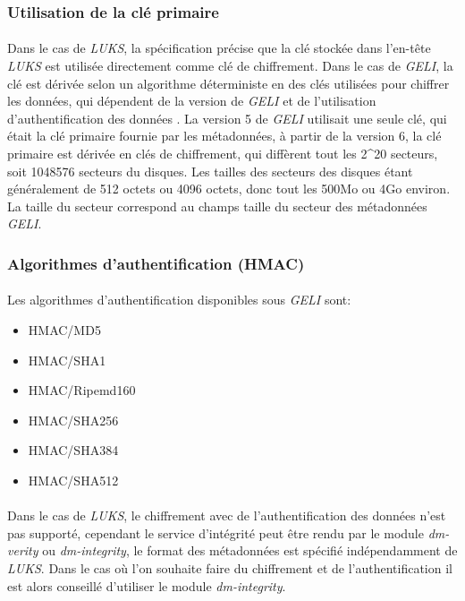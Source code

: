 \subsubsection{Utilisation de la clé primaire}
\paragraph{}
Dans le cas de {\em LUKS}, la spécification \cite{onDiskFormatLuks} précise 
que la clé stockée dans l'en-tête {\em LUKS} est utilisée directement comme 
clé de chiffrement. Dans le cas de {\em GELI}, la clé est dérivée selon un 
algorithme déterministe en des clés utilisées pour chiffrer les données, 
qui dépendent de la version de {\em GELI} et de l'utilisation 
d'authentification des données \cite{manGeli}. 
La version 5 de {\em GELI} utilisait une seule clé, qui était la clé
primaire fournie par les métadonnées, à partir de la version 6, la clé primaire
est dérivée en clés de chiffrement, qui diffèrent tout les 2\textasciicircum20 
secteurs, soit 1048576 secteurs du disques. Les tailles des secteurs des 
disques étant généralement de 512 octets ou 4096 octets, 
donc tout les 500Mo ou 4Go environ.
La taille du secteur correspond au champs taille du secteur des métadonnées
{\em GELI}.

\subsubsection{Algorithmes d'authentification (HMAC)}
\paragraph{}
Les algorithmes d'authentification disponibles sous {\em GELI} sont:
\begin{itemize}
	\item HMAC/MD5
	\item HMAC/SHA1
	\item HMAC/Ripemd160
	\item HMAC/SHA256
	\item HMAC/SHA384
	\item HMAC/SHA512
\end{itemize}

\paragraph{}
Dans le cas de {\em LUKS}, le chiffrement avec de l'authentification des 
données n'est pas supporté, cependant le service d'intégrité peut être rendu 
par le module {\em dm-verity} ou {\em dm-integrity}, le format des métadonnées 
est spécifié indépendamment de {\em LUKS}. Dans le cas où l'on souhaite faire 
du chiffrement et de l'authentification il est alors conseillé d'utiliser le 
module {\em dm-integrity}.

